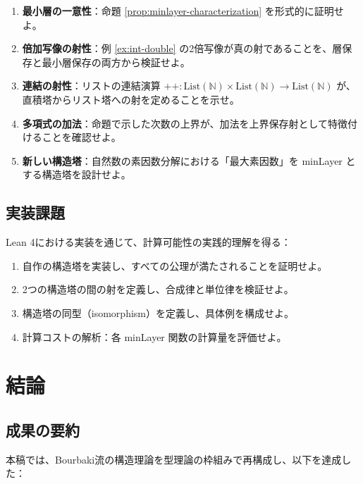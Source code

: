 \documentclass[a4paper,12pt]{ltjsarticle}
\theoremstyle{definition}
\begin{document}
\begin{enumerate}
\item \textbf{最小層の一意性}：命題 \ref{prop:minlayer-characterization} を形式的に証明せよ。

\item \textbf{倍加写像の射性}：例 \ref{ex:int-double} の2倍写像が真の射であることを、層保存と最小層保存の両方から検証せよ。

\item \textbf{連結の射性}：リストの連結演算 $++ : \mathrm{List}(\mathbb{N}) \times \mathrm{List}(\mathbb{N}) \to \mathrm{List}(\mathbb{N})$ が、直積塔からリスト塔への射を定めることを示せ。

\item \textbf{多項式の加法}：命題で示した次数の上界が、加法を上界保存射として特徴付けることを確認せよ。

\item \textbf{新しい構造塔}：自然数の素因数分解における「最大素因数」を minLayer とする構造塔を設計せよ。
\end{enumerate}

\subsection{実装課題}

Lean 4における実装を通じて、計算可能性の実践的理解を得る：

\begin{enumerate}
\item 自作の構造塔を実装し、すべての公理が満たされることを証明せよ。

\item 2つの構造塔の間の射を定義し、合成律と単位律を検証せよ。

\item 構造塔の同型（isomorphism）を定義し、具体例を構成せよ。

\item 計算コストの解析：各 minLayer 関数の計算量を評価せよ。
\end{enumerate}

\section{結論}

\subsection{成果の要約}

本稿では、Bourbaki流の構造理論を型理論の枠組みで再構成し、以下を達成した：
\end{document}
